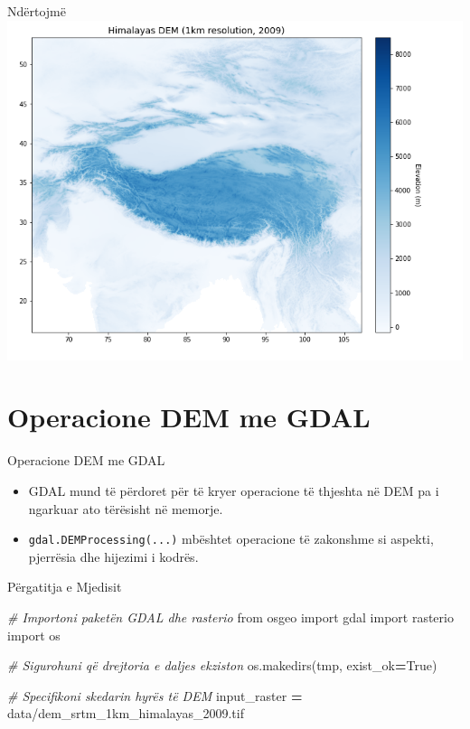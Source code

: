 \documentclass[
  ignorenonframetext,
]{beamer}
\newenvironment{Shaded}{\begin{snugshade}}{\end{snugshade}}
\newcommand{\CommentTok}[1]{\textcolor[rgb]{0.56,0.35,0.01}{\textit{#1}}}
\newcommand{\ImportTok}[1]{#1}
\newcommand{\NormalTok}[1]{#1}
\newcommand{\OperatorTok}[1]{\textcolor[rgb]{0.81,0.36,0.00}{\textbf{#1}}}
\newcommand{\StringTok}[1]{\textcolor[rgb]{0.31,0.60,0.02}{#1}}
\newcommand{\VariableTok}[1]{\textcolor[rgb]{0.00,0.00,0.00}{#1}}
\begin{document}
\begin{frame}{Ndërtojmë}
\protect\hypertarget{nduxebrtojmuxeb-1}{}
\includegraphics{./Figs/himal3.png}
\end{frame}

\hypertarget{operacione-dem-me-gdal}{%
\section{Operacione DEM me GDAL}\label{operacione-dem-me-gdal}}

\begin{frame}[fragile]{Operacione DEM me GDAL}
\protect\hypertarget{operacione-dem-me-gdal-1}{}
\begin{itemize}
\item
  GDAL mund të përdoret për të kryer operacione të thjeshta në DEM pa i
  ngarkuar ato tërësisht në memorje.
\item
  \texttt{gdal.DEMProcessing(...)} mbështet operacione të zakonshme si
  aspekti, pjerrësia dhe hijezimi i kodrës.
\end{itemize}
\end{frame}

\begin{frame}[fragile]{Përgatitja e Mjedisit}
\protect\hypertarget{puxebrgatitja-e-mjedisit}{}

\begin{Shaded}
\begin{Highlighting}[]
\CommentTok{\# Importoni paketën GDAL dhe rasterio}
\ImportTok{from}\NormalTok{ osgeo }\ImportTok{import}\NormalTok{ gdal}
\ImportTok{import}\NormalTok{ rasterio}
\ImportTok{import}\NormalTok{ os}

\CommentTok{\# Sigurohuni që drejtoria e daljes ekziston}
\NormalTok{os.makedirs(}\StringTok{\textquotesingle{}tmp\textquotesingle{}}\NormalTok{, exist\_ok}\OperatorTok{=}\VariableTok{True}\NormalTok{)}

\CommentTok{\# Specifikoni skedarin hyrës të DEM}
\NormalTok{input\_raster }\OperatorTok{=} \StringTok{\textquotesingle{}data/dem\_srtm\_1km\_himalayas\_2009.tif\textquotesingle{}}
\end{Highlighting}
\end{Shaded}
\end{frame}
\end{document}
